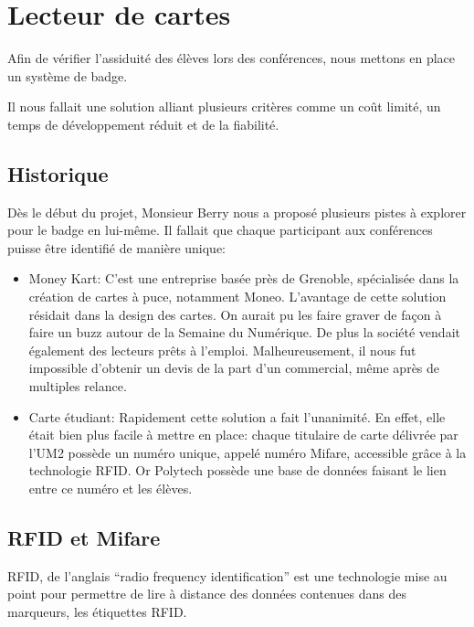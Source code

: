 \chapter{Lecteur de cartes}

Afin de vérifier l'assiduité des élèves lors des conférences, nous mettons en
place un système de badge.

Il nous fallait une solution alliant plusieurs critères comme un coût limité, un temps
de développement réduit et de la fiabilité.


    \section{Historique}
Dès le début du projet, Monsieur Berry nous a proposé plusieurs pistes à 
explorer pour le badge en lui-même. Il fallait que chaque participant aux
conférences puisse être identifié de manière unique:

\begin{itemize}
\item Money Kart: C'est une entreprise basée près de Grenoble, spécialisée
dans la création de cartes à puce, notamment Moneo. L'avantage de cette solution
résidait dans la design des cartes. On aurait pu les faire graver
de façon à faire un buzz autour de la Semaine du Numérique. De plus la société
vendait également des lecteurs prêts à l'emploi.
Malheureusement, il nous fut impossible d'obtenir un devis de la part d'un
commercial, même après de multiples relance.

\item Carte étudiant: Rapidement cette solution a fait l'unanimité. En effet,
elle était bien plus facile à mettre en place: chaque titulaire de carte délivrée
par l'UM2 possède un numéro unique, appelé numéro Mifare, accessible grâce à
la technologie RFID. Or Polytech possède une base de données faisant le lien entre
ce numéro et les élèves.
\end{itemize}


    \section{RFID et Mifare}
RFID, de l'anglais ``radio frequency identification'' est une technologie 
mise au point pour permettre de lire à distance des données contenues dans des
marqueurs, les étiquettes RFID.

